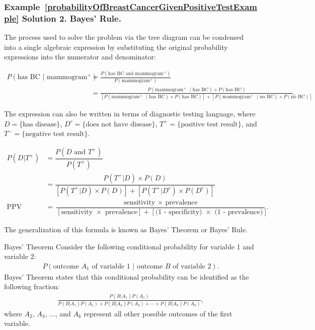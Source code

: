 \subsubsection{Example~\ref{probabilityOfBreastCancerGivenPositiveTestExample} Solution 2. Bayes' Rule.}

The process used to solve the problem via the tree diagram can be condensed into a single algebraic expression by substituting the original probability expressions into the numerator and denominator:

\begin{small}
\begin{align*}
P(\text{has BC } | \text{ mammogram$^+$})
&= \frac{P(\text{has BC and mammogram$^+$})}{P(\text{mammogram$^+$})} \\
&= \frac{P(\text{mammogram$^+$ } | \text{ has BC}) \times P(\text{has BC})}
{[P(\text{mammogram$^+$ } | \text{ has BC}) \times P(\text{has BC})] + [P(\text{mammogram$^+$ } | \text{ no BC}) \times P(\text{no BC})]}.
\end{align*}
\end{small}

The expression can also be written in terms of diagnostic testing language, where $D = \text{\{has disease\}}$, $D^c = \text{\{does not have disease\}}$, $T^{+} = \text{\{positive test result\}}$, and $T^{-} = \text{\{negative test result\}}$.

\begin{align*}
P(D|T^{+}) &= \dfrac{P(D \text{ and } T^{+})}{P(T^{+})} \\
&= \dfrac{P(T^{+}|D) \times P(D)}{[P(T^{+}|D) \times P(D)] + [P(T^{+}|D^c) \times P(D^c)]} \\
\text{PPV} &= \dfrac{\text{sensitivity } \times \text{ prevalence}}{[\text{sensitivity } \times \text{ prevalence}] + [\text{(1 - specificity) } \times \text{ (1 - prevalence)}]}.
\end{align*}

The generalization of this formula is known as Bayes' Theorem or Bayes' Rule.

\begin{onebox}{Bayes' Theorem}
Consider the following conditional probability for variable 1 and variable 2:\vspace{-1.5mm}
\begin{align*}
P(\text{outcome $A_1$ of variable 1 } | \text{ outcome $B$ of variable 2}).
\end{align*}
Bayes' Theorem states that this conditional probability can be identified as the following fraction:\vspace{-1.5mm}
\begin{align}
\frac{P(B | A_1) P(A_1)}
	{P(B | A_1) P(A_1) + P(B | A_2) P(A_2) + \cdots + P(B | A_k) P(A_k)},
	\label{equationOfBayesTheorem}
\end{align}
where $A_2$, $A_3$, ..., and $A_k$ represent all other possible outcomes of the first variable.
\end{onebox}

